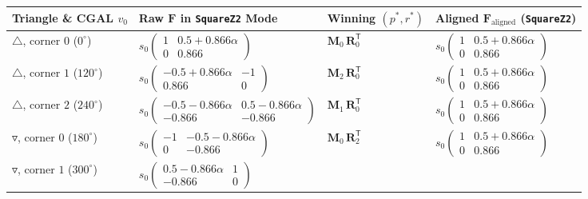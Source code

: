 \documentclass[11pt,a4paper]{article}
\newcommand{\T}{^{\mathsf T}}
\newcommand{\code}[1]{\texttt{#1}}
\begin{document}
\begin{center}
\renewcommand{\arraystretch}{1.35}
\small
\begin{tabular}{@{}llll@{}}
\toprule
\textbf{Triangle \& CGAL $v_0$} & \textbf{Raw $\mathbf{F}$ in \code{SquareZ2} Mode} & \textbf{Winning $(p^*, r^*)$} & \textbf{Aligned $\mathbf{F}_{\text{aligned}}$ (\code{SquareZ2})} \\
\midrule
$\triangle$, corner $0$ ($0^\circ$) &
$s_0\begin{pmatrix} 1 & 0.5 + 0.866\alpha \\ 0 & 0.866 \end{pmatrix}$ &
$\mathbf{M}_0\,\mathbf{R}_0\T$ &
$s_0\begin{pmatrix} 1 & 0.5 + 0.866\alpha \\ 0 & 0.866 \end{pmatrix}$ \\[8pt]
$\triangle$, corner $1$ ($120^\circ$) &
$s_0\begin{pmatrix} -0.5 + 0.866\alpha & -1 \\ 0.866 & 0 \end{pmatrix}$ &
$\mathbf{M}_2\,\mathbf{R}_0\T$ &
$s_0\begin{pmatrix} 1 & 0.5 + 0.866\alpha \\ 0 & 0.866 \end{pmatrix}$ \\[8pt]
$\triangle$, corner $2$ ($240^\circ$) &
$s_0\begin{pmatrix} -0.5 - 0.866\alpha & 0.5 - 0.866\alpha \\ -0.866 & -0.866 \end{pmatrix}$ &
$\mathbf{M}_1\,\mathbf{R}_0\T$ &
$s_0\begin{pmatrix} 1 & 0.5 + 0.866\alpha \\ 0 & 0.866 \end{pmatrix}$ \\[8pt]
$\triangledown$, corner $0$ ($180^\circ$) &
$s_0\begin{pmatrix} -1 & -0.5 - 0.866\alpha \\ 0 & -0.866 \end{pmatrix}$ &
$\mathbf{M}_0\,\mathbf{R}_2\T$ &
$s_0\begin{pmatrix} 1 & 0.5 + 0.866\alpha \\ 0 & 0.866 \end{pmatrix}$ \\[8pt]
$\triangledown$, corner $1$ ($300^\circ$) &
$s_0\begin{pmatrix} 0.5 - 0.866\alpha & 1 \\ -0.866 & 0 \end{pmatrix}$ &

\end{tabular}
\end{center}
\end{document}
